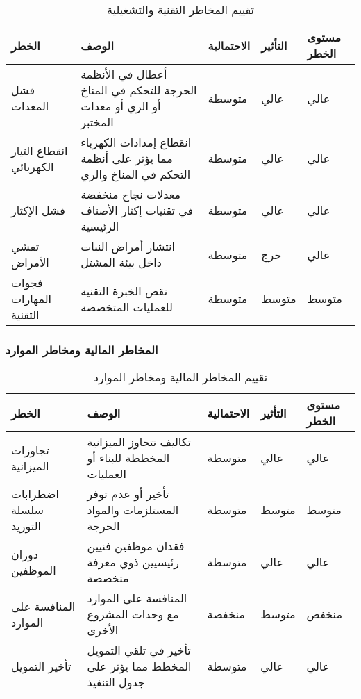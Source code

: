 \begin{table}[h]
\centering
\begin{tabular}{|p{3cm}|p{4cm}|p{2cm}|p{2cm}|p{3cm}|}
\hline
\textbf{الخطر} & \textbf{الوصف} & \textbf{الاحتمالية} & \textbf{التأثير} & \textbf{مستوى الخطر} \\
\hline
فشل المعدات & أعطال في الأنظمة الحرجة للتحكم في المناخ أو الري أو معدات المختبر & متوسطة & عالي & عالي \\
\hline
انقطاع التيار الكهربائي & انقطاع إمدادات الكهرباء مما يؤثر على أنظمة التحكم في المناخ والري & متوسطة & عالي & عالي \\
\hline
فشل الإكثار & معدلات نجاح منخفضة في تقنيات إكثار الأصناف الرئيسية & متوسطة & عالي & عالي \\
\hline
تفشي الأمراض & انتشار أمراض النبات داخل بيئة المشتل & متوسطة & حرج & عالي \\
\hline
فجوات المهارات التقنية & نقص الخبرة التقنية للعمليات المتخصصة & متوسطة & متوسط & متوسط \\
\hline
\end{tabular}
\caption{تقييم المخاطر التقنية والتشغيلية}
\end{table}

\subsubsection{المخاطر المالية ومخاطر الموارد}

\begin{table}[h]
\centering
\begin{tabular}{|p{3cm}|p{4cm}|p{2cm}|p{2cm}|p{3cm}|}
\hline
\textbf{الخطر} & \textbf{الوصف} & \textbf{الاحتمالية} & \textbf{التأثير} & \textbf{مستوى الخطر} \\
\hline
تجاوزات الميزانية & تكاليف تتجاوز الميزانية المخططة للبناء أو العمليات & متوسطة & عالي & عالي \\
\hline
اضطرابات سلسلة التوريد & تأخير أو عدم توفر المستلزمات والمواد الحرجة & متوسطة & متوسط & متوسط \\
\hline
دوران الموظفين & فقدان موظفين فنيين رئيسيين ذوي معرفة متخصصة & متوسطة & عالي & عالي \\
\hline
المنافسة على الموارد & المنافسة على الموارد مع وحدات المشروع الأخرى & منخفضة & متوسط & منخفض \\
\hline
تأخير التمويل & تأخير في تلقي التمويل المخطط مما يؤثر على جدول التنفيذ & متوسطة & عالي & عالي \\
\hline
\end{tabular}
\caption{تقييم المخاطر المالية ومخاطر الموارد}
\end{table}

